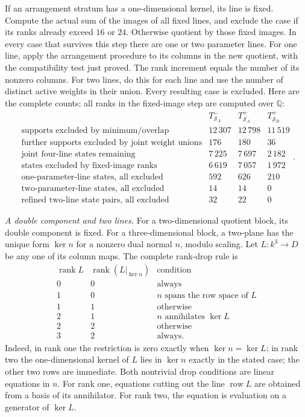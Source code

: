 If an arrangement stratum has a one-dimensional kernel, its line is
fixed.  Compute the actual sum of the images of all fixed lines, and
exclude the case if its ranks already exceed $16$ or $24$.
Otherwise quotient by those fixed images.  In every case that survives
this step there are one or two parameter lines.
For one line, apply the arrangement procedure to its columns in the
new quotient, with the compatibility test just proved.  The rank
increment equals the number of its nonzero columns.
For two lines, do this for each line and use the number of distinct
active weights in their union.  Every resulting case is excluded.
Here are the complete counts; all ranks in the fixed-image step are
computed over $\mathbb Q$:
\[
\begin{array}{c|r|r|r}
 &T^-_{\mathcal S_A}&T^+_{\mathcal S_A}&T^+_{\mathcal S_B}\\\hline
 \text{supports excluded by minimum/overlap}&12\,307&12\,798&11\,519\\
 \text{further supports excluded by joint weight unions}&176&180&36\\
 \text{joint four-line states remaining}&7\,225&7\,697&2\,182\\
 \text{states excluded by fixed-image ranks}&6\,619&7\,057&1\,972\\
 \text{one-parameter-line states, all excluded}&592&626&210\\
 \text{two-parameter-line states, all excluded}&14&14&0\\
 \text{refined two-line state pairs, all excluded}&32&22&0
\end{array}.
\]

\emph{A double component and two lines.}
For a two-dimensional quotient block, its double component is fixed.
For a three-dimensional block, a two-plane has the unique form
$\ker n$ for a nonzero dual normal $n$, modulo scaling.
Let $L:k^3\to D$ be any one of its column maps.
The complete rank-drop rule is
\[
\begin{array}{c|c|l}
 \operatorname{rank}L&\operatorname{rank}(L|_{\ker n})&\text{condition}\\\hline
 0&0&\text{always}\\
 1&0&n\text{ spans the row space of }L\\
 1&1&\text{otherwise}\\
 2&1&n\text{ annihilates }\ker L\\
 2&2&\text{otherwise}\\
 3&2&\text{always}.
\end{array}
\]
Indeed, in rank one the restriction is zero exactly when
$\ker n=\ker L$; in rank two the one-dimensional kernel of $L$ lies in
$\ker n$ exactly in the stated case; the other two rows are immediate.
Both nontrivial drop conditions are linear equations in $n$.
For rank one, equations cutting out the line $\operatorname{row}L$ are
obtained from a basis of its annihilator.  For rank two, the equation is
evaluation on a generator of $\ker L$.

